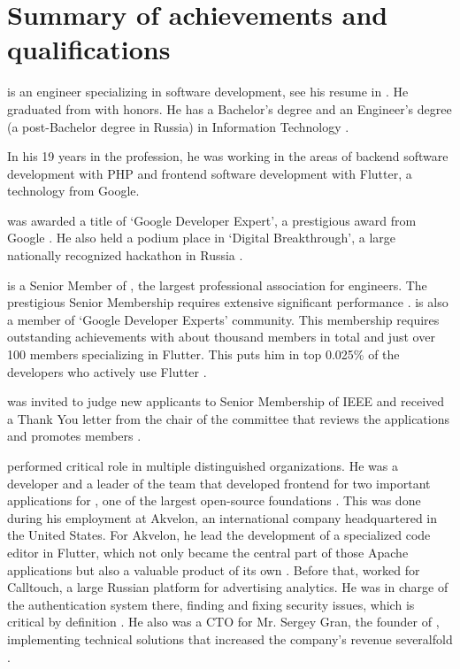 \section{Summary of \mrls achievements and qualifications}

\mrl is an engineer specializing in software development, see his resume in .
He graduated from \Nntu with honors.
He has a Bachelor's degree 
and an Engineer's degree (a post-Bachelor degree in Russia) in Information Technology .

In his 19 years in the profession, he was working in the areas of backend software development with PHP
and frontend software development with Flutter, a technology from Google.

\mrl was awarded a title of `Google Developer Expert',
a prestigious award from Google .
He also held a podium place in `Digital Breakthrough',
a large nationally recognized hackathon in Russia .

\mrl is a Senior Member of \Ieee, the largest professional association for engineers.
The prestigious Senior Membership requires extensive significant performance .
\mrl is also a member of `Google Developer Experts' community.
This membership requires outstanding achievements
with about thousand members in total and just over 100 members specializing in Flutter.
This puts him in top 0.025\% of the developers who actively use Flutter .

\mrl was invited to judge new applicants to Senior Membership of IEEE
and received a Thank You letter from the chair of the committee
that reviews the applications and promotes members .

\mrl performed critical role in multiple distinguished organizations.
He was a developer and a leader of the team that developed frontend
for two important applications for \Asf, one of the largest open-source foundations
.
This was done during his employment at Akvelon, an international company headquartered in the United States.
For Akvelon, he lead the development of a specialized code editor in Flutter,
which not only became the central part of those Apache applications but also a valuable product of its own
.
Before that, \mrl worked for Calltouch, a large Russian platform for advertising analytics.
He was in charge of the authentication system there, finding and fixing
security issues, which is critical by definition .
He also was a CTO for Mr. Sergey Gran, the founder of \GSchool,
implementing technical solutions that increased the company's revenue severalfold .

